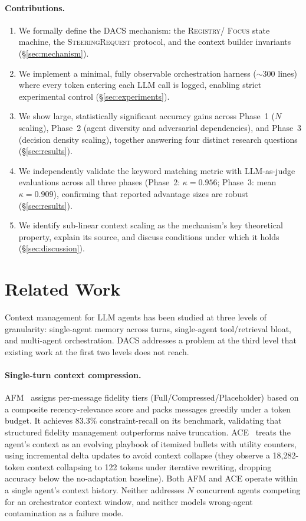 \documentclass{article}
\begin{document}
\paragraph{Contributions.}
\begin{enumerate}
  \item We formally define the DACS mechanism: the \textsc{Registry}/
  \textsc{Focus} state machine, the \textsc{SteeringRequest} protocol,
  and the context builder invariants (\S\ref{sec:mechanism}).
  \item We implement a minimal, fully observable orchestration harness
  ($\sim$300 lines) where every token entering each LLM call is logged,
  enabling strict experimental control (\S\ref{sec:experiments}).
  \item We show large, statistically significant accuracy gains across
  Phase~1 ($N$ scaling), Phase~2 (agent diversity and adversarial
  dependencies), and Phase~3 (decision density scaling), together
  answering four distinct research questions (\S\ref{sec:results}).
  \item We independently validate the keyword matching metric with
  LLM-as-judge evaluations across all three phases (Phase~2: $\kappa=0.956$;
  Phase~3: mean $\kappa=0.909$), confirming that reported advantage sizes
  are robust (\S\ref{sec:results}).
  \item We identify sub-linear context scaling as the mechanism's key
  theoretical property, explain its source, and discuss conditions under
  which it holds (\S\ref{sec:discussion}).
\end{enumerate}

\section{Related Work}
\label{sec:related}

Context management for LLM agents has been studied at three levels of
granularity: single-agent memory across turns, single-agent tool/retrieval
bloat, and multi-agent orchestration.
DACS addresses a problem at the third level that existing work at the
first two levels does not reach.

\paragraph{Single-turn context compression.}
AFM~\citep{afm2024} assigns per-message fidelity tiers
(Full/Compressed/Placeholder) based on a composite recency-relevance score
and packs messages greedily under a token budget.
It achieves 83.3\% constraint-recall on its benchmark, validating that
structured fidelity management outperforms naive truncation.
ACE~\citep{ace2026} treats the agent's context as an evolving playbook
of itemized bullets with utility counters, using incremental delta updates
to avoid context collapse (they observe a 18{,}282-token context collapsing
to 122 tokens under iterative rewriting, dropping accuracy below the
no-adaptation baseline).
Both AFM and ACE operate within a single agent's context history.
Neither addresses $N$ concurrent agents competing for an orchestrator
context window, and neither models wrong-agent contamination as a failure
mode.
\end{document}
